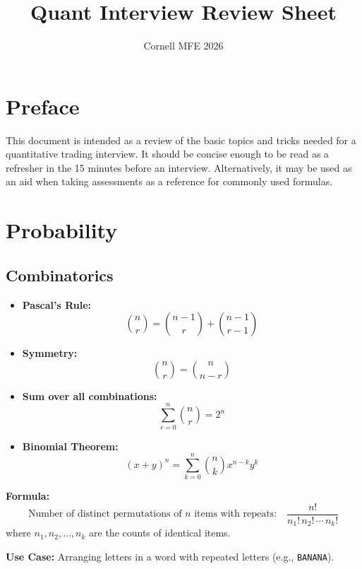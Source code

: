 \documentclass{article}
\title{Quant Interview Review Sheet}
\author{Cornell MFE 2026}
\begin{document}
\maketitle
\tableofcontents

\section{Preface}
This document is intended as a review of the basic topics and tricks needed for a quantitative trading interview. It should be concise enough to be read as a refresher in the 15 minutes before an interview. Alternatively, it may be used as an aid when taking assessments as a reference for commonly used formulas.

\newpage

\section{Probability}
\subsection{Combinatorics}

\begin{tcolorbox}[title=Useful Combinatorics Identities]
\begin{itemize}
  \item \textbf{Pascal's Rule:}
  \[
  \binom{n}{r} = \binom{n-1}{r} + \binom{n-1}{r-1}
  \]

  \item \textbf{Symmetry:}
  \[
  \binom{n}{r} = \binom{n}{n - r}
  \]

  \item \textbf{Sum over all combinations:}
  \[
  \sum_{r=0}^{n} \binom{n}{r} = 2^n
  \]

  \item \textbf{Binomial Theorem:}
  \[
  (x + y)^n = \sum_{k=0}^{n} \binom{n}{k} x^{n-k} y^k
  \]
\end{itemize}
\end{tcolorbox}

\begin{tcolorbox}[title=Permutations with Identical Items]
\textbf{Formula:}
\[
\text{Number of distinct permutations of } n \text{ items with repeats:} \quad
\frac{n!}{n_1! \, n_2! \, \cdots \, n_k!}
\]
where \( n_1, n_2, \ldots, n_k \) are the counts of identical items.

\textbf{Use Case:} Arranging letters in a word with repeated letters (e.g., \texttt{BANANA}).

\end{tcolorbox}
\end{document}
